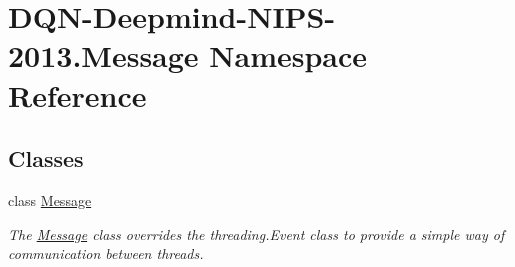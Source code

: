 \hypertarget{namespaceDQN-Deepmind-NIPS-2013_1_1Message}{}\section{D\+Q\+N-\/\+Deepmind-\/\+N\+I\+P\+S-\/2013.Message Namespace Reference}
\label{namespaceDQN-Deepmind-NIPS-2013_1_1Message}
\subsection*{Classes}
\begin{DoxyCompactItemize}
\item 
class \hyperlink{classDQN-Deepmind-NIPS-2013_1_1Message_1_1Message}{Message}
\begin{DoxyCompactList}\small\item\em The \hyperlink{classDQN-Deepmind-NIPS-2013_1_1Message_1_1Message}{Message} class overrides the threading.\+Event class to provide a simple way of communication between threads. \end{DoxyCompactList}\end{DoxyCompactItemize}
